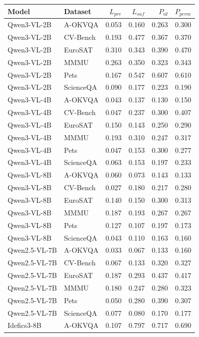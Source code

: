 \begin{tabular}{llrrrr}
\toprule
Model & Dataset & $L_{pre}$ & $L_{suf}$ & $P_{id}$ & $P_{perm}$ \\
\midrule
Qwen3-VL-2B & A-OKVQA & 0.053 & 0.160 & 0.263 & 0.300 \\
Qwen3-VL-2B & CV-Bench & 0.193 & 0.477 & 0.367 & 0.370 \\
Qwen3-VL-2B & EuroSAT & 0.310 & 0.343 & 0.390 & 0.470 \\
Qwen3-VL-2B & MMMU & 0.263 & 0.350 & 0.323 & 0.343 \\
Qwen3-VL-2B & Pets & 0.167 & 0.547 & 0.607 & 0.610 \\
Qwen3-VL-2B & ScienceQA & 0.090 & 0.177 & 0.223 & 0.190 \\
Qwen3-VL-4B & A-OKVQA & 0.043 & 0.137 & 0.130 & 0.150 \\
Qwen3-VL-4B & CV-Bench & 0.047 & 0.237 & 0.300 & 0.407 \\
Qwen3-VL-4B & EuroSAT & 0.150 & 0.143 & 0.250 & 0.290 \\
Qwen3-VL-4B & MMMU & 0.193 & 0.310 & 0.247 & 0.317 \\
Qwen3-VL-4B & Pets & 0.047 & 0.153 & 0.300 & 0.277 \\
Qwen3-VL-4B & ScienceQA & 0.063 & 0.153 & 0.197 & 0.233 \\
Qwen3-VL-8B & A-OKVQA & 0.060 & 0.073 & 0.143 & 0.133 \\
Qwen3-VL-8B & CV-Bench & 0.027 & 0.180 & 0.217 & 0.280 \\
Qwen3-VL-8B & EuroSAT & 0.140 & 0.150 & 0.300 & 0.313 \\
Qwen3-VL-8B & MMMU & 0.187 & 0.193 & 0.267 & 0.267 \\
Qwen3-VL-8B & Pets & 0.127 & 0.107 & 0.197 & 0.173 \\
Qwen3-VL-8B & ScienceQA & 0.043 & 0.110 & 0.163 & 0.160 \\
Qwen2.5-VL-7B & A-OKVQA & 0.033 & 0.067 & 0.133 & 0.160 \\
Qwen2.5-VL-7B & CV-Bench & 0.067 & 0.133 & 0.320 & 0.327 \\
Qwen2.5-VL-7B & EuroSAT & 0.187 & 0.293 & 0.437 & 0.417 \\
Qwen2.5-VL-7B & MMMU & 0.180 & 0.247 & 0.280 & 0.323 \\
Qwen2.5-VL-7B & Pets & 0.050 & 0.280 & 0.390 & 0.307 \\
Qwen2.5-VL-7B & ScienceQA & 0.077 & 0.080 & 0.170 & 0.177 \\
Idefics3-8B & A-OKVQA & 0.107 & 0.797 & 0.717 & 0.690 \\

\end{tabular}
